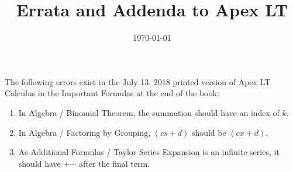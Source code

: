 \documentclass{amsart}
\title{Errata and Addenda to Apex LT}
\date{\today}
\begin{document}
\vspace*{-.6in}

\maketitle

\noindent
The following errors exist in the July 13, 2018 printed version of Apex LT Calculus in the Important Formulas at the end of the book:
\begin{enumerate}
\item In Algebra / Binomial Theorem, the summation should have an index of $k$.
\item In Algebra / Factoring by Grouping, $(cs+d)$ should be $(cx+d)$.
\item As Additional Formulas / Taylor Series Expansion is an infinite series, it should have $+\dotsb$ after the final term.
\label{2018-07-13III}
\end{enumerate}%
\end{document}
